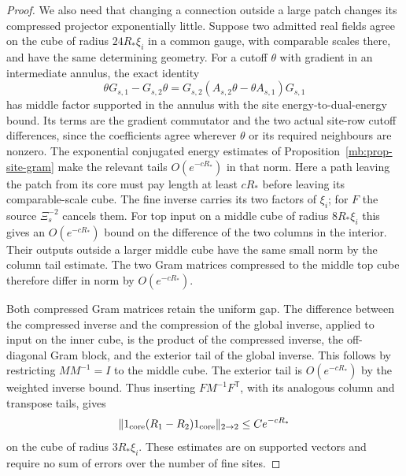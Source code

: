 \documentclass[11pt,letterpaper,reqno]{amsart}
\numberwithin{equation}{section}
\theoremstyle{definition}
\theoremstyle{remark}
\begin{document}
\begin{proof}
We also need that changing a connection outside a large
patch changes its compressed projector exponentially little.
Suppose two admitted real fields agree on the cube of
radius \(24R_*\xi_i\) in a common gauge, with comparable
scales there, and have the same determining geometry.
For a cutoff \(\theta\) with gradient in an intermediate
annulus, the exact identity
\[
 \theta G_{s,1}-G_{s,2}\theta
           =G_{s,2}(A_{s,2}\theta-\theta A_{s,1})G_{s,1}
\]
has middle factor supported in the annulus with the
site energy-to-dual-energy bound. Its terms are the
gradient commutator and the two actual site-row cutoff
differences, since the coefficients agree wherever
\(\theta\) or its required neighbours are nonzero.
The exponential conjugated energy estimates of
Proposition~\ref{mb:prop-site-gram} make the relevant
tails \(O(e^{-cR_*})\) in that norm. Here a path leaving
the patch from its core must pay length at least
\(cR_*\) before leaving its comparable-scale cube.
The fine inverse carries its two factors of \(\xi_i\);
for \(F\) the source \(\Xi_s^{-2}\) cancels them.
For top input on a middle cube of radius \(8R_*\xi_i\)
this gives an \(O(e^{-cR_*})\) bound on the difference of
the two columns in the interior. Their outputs outside
a larger middle cube have the same small norm by the
column tail estimate. The two Gram matrices compressed
to the middle top cube therefore differ in norm by
\(O(e^{-cR_*})\).

Both compressed Gram matrices retain the uniform gap.
The difference between the compressed inverse and the
compression of the global inverse, applied to input on
the inner cube, is the product of the compressed inverse,
the off-diagonal Gram block, and the exterior tail of
the global inverse. This follows by restricting
\(MM^{-1}=I\) to the middle cube. The exterior tail is
\(O(e^{-cR_*})\) by the weighted inverse bound. Thus
inserting \(F M^{-1}F^{\mathsf T}\), with its analogous
column and transpose tails, gives
\begin{equation}\label{mb:eq-projector-shield}
 \|1_{\rm core}(R_1-R_2)1_{\rm core}\|_{2\to2}
                                                    \le C e^{-cR_*}
\end{equation}
on the cube of radius \(3R_*\xi_i\). These estimates
are on supported vectors and require no sum of errors
over the number of fine sites.


\end{proof}
\end{document}
